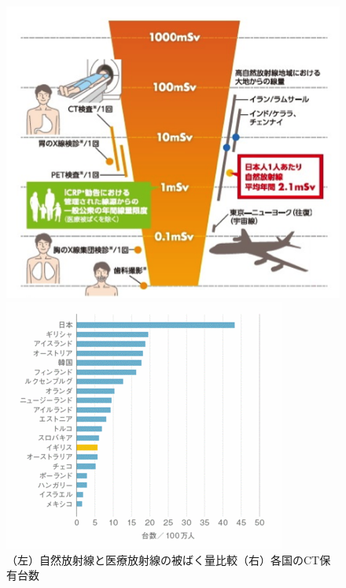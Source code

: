 \begin{figure}[H]
 \begin{minipage}{0.5\hsize}
  \begin{center}
 \includegraphics[bb=0.000000 0.000000 224.141471 195.823812,width=0.9\hsize]{image2/chapter1/dose_medical.png} 
  \end{center}
  \vspace{-1cm}
  \caption*{}
 \end{minipage}
 \begin{minipage}{0.5\hsize}
  \begin{center}
 \includegraphics[bb=0.000000 0.000000 350.000000 313.000000,width=0.9\hsize]{image2/chapter1/CT_number.png} 
  \end{center}
  \vspace{-1cm}
  \caption*{}
 \end{minipage}
 \begin{center}
  \caption{（左）自然放射線と医療放射線の被ばく量比較（右）各国のCT保有台数}
  \label{fig:dose}
  \end{center}
\end{figure}



